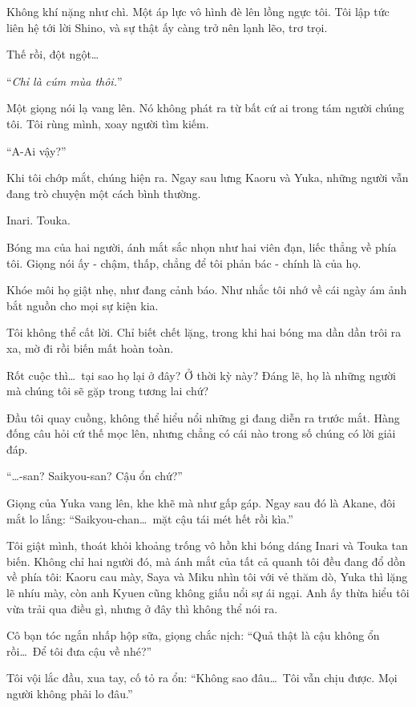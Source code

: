 \documentclass[../main.tex]{subfiles}
\begin{document}
Không khí nặng như chì. Một áp lực vô hình đè lên lồng ngực tôi. Tôi lập tức liên hệ tới lời Shino, và sự thật ấy càng trở nên lạnh lẽo, trơ trọi.

Thế rồi, đột ngột\dots

``\emph{Chỉ là cúm mùa thôi.}''

Một giọng nói lạ vang lên. Nó không phát ra từ bất cứ ai trong tám người chúng tôi. Tôi rùng mình, xoay người tìm kiếm.

``A-Ai vậy?''

Khi tôi chớp mắt, chúng hiện ra. Ngay sau lưng Kaoru và Yuka, những người vẫn đang trò chuyện một cách bình thường.

Inari. Touka.


Bóng ma của hai người, ánh mắt sắc nhọn như hai viên đạn, liếc thẳng về phía tôi. Giọng nói ấy - chậm, thấp, chẳng để tôi phản bác - chính là của họ.

Khóe môi họ giật nhẹ, như đang cảnh báo. Như nhắc tôi nhớ về cái ngày ám ảnh bắt nguồn cho mọi sự kiện kia.

Tôi không thể cất lời. Chỉ biết chết lặng, trong khi hai bóng ma dần dần trôi ra xa, mờ đi rồi biến mất hoàn toàn.

Rốt cuộc thì\dots\ tại sao họ lại ở đây? Ở thời kỳ này? Đáng lẽ, họ là những người mà chúng tôi sẽ gặp trong tương lai chứ?

Đầu tôi quay cuồng, không thể hiểu nổi những gi đang diễn ra trước mắt. Hàng đống câu hỏi cứ thế mọc lên, nhưng chẳng có cái nào trong số chúng có lời giải đáp.

``\dots-san? Saikyou-san? Cậu ổn chứ?''

Giọng của Yuka vang lên, khe khẽ mà như gấp gáp. Ngay sau đó là Akane, đôi mắt lo lắng: ``Saikyou-chan\dots\ mặt cậu tái mét hết rồi kìa.''

Tôi giật mình, thoát khỏi khoảng trống vô hồn khi bóng dáng Inari và Touka tan biến. Không chỉ hai người đó, mà ánh mắt của tất cả quanh tôi đều đang đổ dồn về phía tôi: Kaoru cau mày, Saya và Miku nhìn tôi với vẻ thăm dò, Yuka thì lặng lẽ nhíu mày, còn anh Kyuen cũng không giấu nổi sự ái ngại. Anh ấy thừa hiểu tôi vừa trải qua điều gì, nhưng ở đây thì không thể nói ra.

Cô bạn tóc ngắn nhấp hộp sữa, giọng chắc nịch: ``Quả thật là cậu không ổn rồi\dots\ Để tôi đưa cậu về nhé?''

Tôi vội lắc đầu, xua tay, cố tỏ ra ổn: ``Không sao đâu\dots\ Tôi vẫn chịu được. Mọi người không phải lo đâu.''
\end{document}
